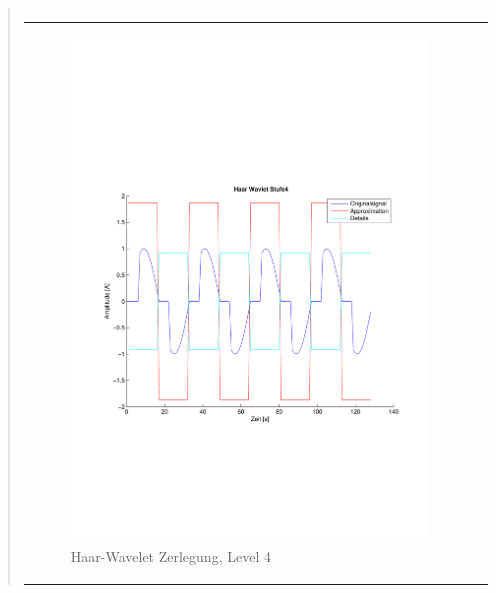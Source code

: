 \begin{quote}
\begin{center}
\begin{tabular}{ll}
                \end{tabular}
                \end{center}
    
                
                
        \begin{center}
                \begin{tabular}{ll}
    
                \hspace{-8em}
                    \begin{minipage}{0.6\textwidth}
    
                        \begin{figure}[H]
                            \label{fig:}
                            \includegraphics[scale=0.4, trim = 2cm 6cm 1cm
                            7.5cm,
                            clip]{./Bilder/Termin8/Haar_Wavlet_lvl_4}
                            \caption{Haar-Wavelet Zerlegung, Level 4}
                        \end{figure}
    

\end{minipage}
\end{tabular}
\end{center}
\end{quote}
